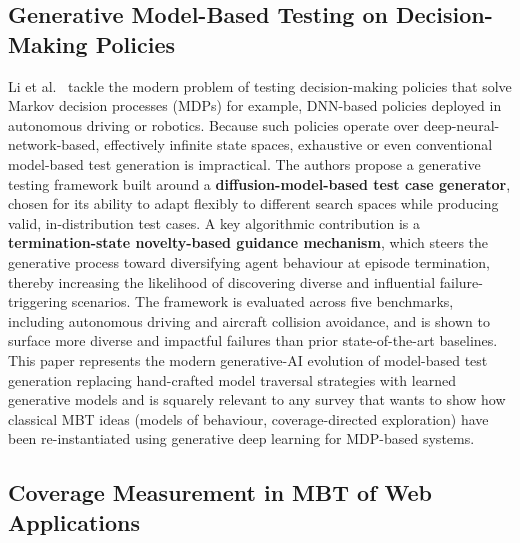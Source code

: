 \subsection{Generative Model-Based Testing on Decision-Making Policies}
\label{sec:lr_li}

Li et al.~\cite{li2023generative} tackle the modern problem of testing
decision-making policies that solve Markov decision processes
(MDPs) for example, DNN-based policies deployed in autonomous driving
or robotics.  Because such policies operate over deep-neural-network-based,
effectively infinite state spaces, exhaustive or even conventional
model-based test generation is impractical.  The authors propose a
generative testing framework built around a \textbf{diffusion-model-based
test case generator}, chosen for its ability to adapt flexibly to
different search spaces while producing valid, in-distribution test
cases.  A key algorithmic contribution is a
\textbf{termination-state novelty-based guidance mechanism}, which steers
the generative process toward diversifying agent behaviour at episode
termination, thereby increasing the likelihood of discovering diverse and
influential failure-triggering scenarios.  The framework is evaluated
across five benchmarks, including autonomous driving and aircraft
collision avoidance, and is shown to surface more diverse and impactful
failures than prior state-of-the-art baselines.  This paper represents
the modern generative-AI evolution of model-based test generation replacing
hand-crafted model traversal strategies with learned generative models and
is squarely relevant to any survey that wants to show how classical MBT
ideas (models of behaviour, coverage-directed exploration) have been
re-instantiated using generative deep learning for MDP-based systems.

\subsection{Coverage Measurement in MBT of Web Applications}
\label{sec:lr_garousi_coverage}

